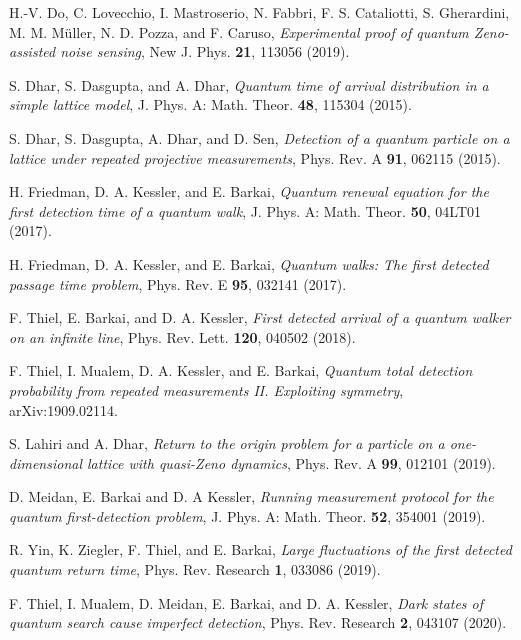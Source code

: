 \documentclass[12pt]{iopart}
\begin{document}
\begin{thebibliography}{99}
H.-V. Do, C. Lovecchio, I. Mastroserio, N. Fabbri,  F. S. Cataliotti, S. Gherardini, M. M. M\"{u}ller, N. D. Pozza, and F. Caruso,
 \textit{Experimental proof of quantum Zeno-assisted noise sensing}, New J. Phys. \textbf{21}, 113056 (2019).

S. Dhar, S. Dasgupta, and A. Dhar, \textit{Quantum time of arrival distribution in a simple lattice model},  J.  Phys.  A: Math.  Theor.  {\bf 48}, 115304 (2015).

S. Dhar, S. Dasgupta, A. Dhar, and D. Sen, \textit{
Detection of a quantum particle on a lattice under repeated projective measurements}, Phys.  Rev.  A {\bf 91},  062115 (2015).

H. Friedman,  D. A. Kessler, and E. Barkai, \textit{Quantum renewal equation for the first detection time of a quantum walk}, J.  Phys.  A: Math. Theor.  {\bf 50}, 04LT01 (2017).

H.  Friedman, D.  A.  Kessler,  and E.  Barkai, \textit{
Quantum walks: The first detected passage time problem},  Phys.  Rev.  E {\bf 95}, 032141 (2017).

F. Thiel,  E. Barkai,  and D. A. Kessler, \textit{First detected arrival of a quantum walker on an infinite line},  Phys.  Rev.  Lett.  {\bf 120},  040502 (2018).

F. Thiel, I. Mualem, D. A. Kessler, and E. Barkai, \textit{
Quantum total detection probability from repeated measurements II. Exploiting symmetry}, arXiv:1909.02114.
 
S. Lahiri and A. Dhar, \textit{
Return to the origin problem for a particle on a one-dimensional lattice with quasi-Zeno dynamics}, Phys.  Rev.  A {\bf 99},  012101 (2019). 

D. Meidan,  E. Barkai and D. A Kessler, \textit{Running measurement protocol for the quantum first-detection problem}, J.  Phys.  A: Math. Theor.  {\bf 52}, 354001 (2019).

R. Yin, K.  Ziegler, F.  Thiel, and E.  Barkai, \textit{Large fluctuations of the first detected quantum return time}, Phys.  Rev.  Research {\bf 1}, 033086 (2019).
 
F. Thiel, I. Mualem, D. Meidan, E. Barkai, and D. A. Kessler, \textit{Dark states of quantum search cause imperfect detection}, Phys.  Rev. Research {\bf 2},  043107 (2020).


\end{thebibliography}
\end{document}
